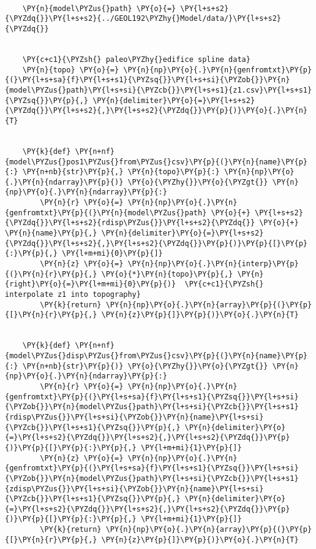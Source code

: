 \begin{tcolorbox}[breakable, size=fbox, boxrule=1pt, pad at break*=1mm,colback=cellbackground, colframe=cellborder]
\begin{Verbatim}[commandchars=\\\{\}]
    
    \PY{n}{model\PYZus{}path} \PY{o}{=} \PY{l+s+s2}{\PYZdq{}}\PY{l+s+s2}{../GEOL192\PYZhy{}Model/data/}\PY{l+s+s2}{\PYZdq{}}
    
    
    \PY{c+c1}{\PYZsh{} paleo\PYZhy{}edifice spline data}
    \PY{n}{topo} \PY{o}{=} \PY{n}{np}\PY{o}{.}\PY{n}{genfromtxt}\PY{p}{(}\PY{l+s+sa}{f}\PY{l+s+s1}{\PYZsq{}}\PY{l+s+si}{\PYZob{}}\PY{n}{model\PYZus{}path}\PY{l+s+si}{\PYZcb{}}\PY{l+s+s1}{z1.csv}\PY{l+s+s1}{\PYZsq{}}\PY{p}{,} \PY{n}{delimiter}\PY{o}{=}\PY{l+s+s2}{\PYZdq{}}\PY{l+s+s2}{,}\PY{l+s+s2}{\PYZdq{}}\PY{p}{)}\PY{o}{.}\PY{n}{T}
    
    
    \PY{k}{def} \PY{n+nf}{model\PYZus{}pos1\PYZus{}from\PYZus{}csv}\PY{p}{(}\PY{n}{name}\PY{p}{:} \PY{n+nb}{str}\PY{p}{,} \PY{n}{topo}\PY{p}{:} \PY{n}{np}\PY{o}{.}\PY{n}{ndarray}\PY{p}{)} \PY{o}{\PYZhy{}}\PY{o}{\PYZgt{}} \PY{n}{np}\PY{o}{.}\PY{n}{ndarray}\PY{p}{:}
        \PY{n}{r} \PY{o}{=} \PY{n}{np}\PY{o}{.}\PY{n}{genfromtxt}\PY{p}{(}\PY{n}{model\PYZus{}path} \PY{o}{+} \PY{l+s+s2}{\PYZdq{}}\PY{l+s+s2}{rdisp\PYZus{}}\PY{l+s+s2}{\PYZdq{}} \PY{o}{+} \PY{n}{name}\PY{p}{,} \PY{n}{delimiter}\PY{o}{=}\PY{l+s+s2}{\PYZdq{}}\PY{l+s+s2}{,}\PY{l+s+s2}{\PYZdq{}}\PY{p}{)}\PY{p}{[}\PY{p}{:}\PY{p}{,} \PY{l+m+mi}{0}\PY{p}{]}
        \PY{n}{z} \PY{o}{=} \PY{n}{np}\PY{o}{.}\PY{n}{interp}\PY{p}{(}\PY{n}{r}\PY{p}{,} \PY{o}{*}\PY{n}{topo}\PY{p}{,} \PY{n}{right}\PY{o}{=}\PY{l+m+mi}{0}\PY{p}{)}  \PY{c+c1}{\PYZsh{} interpolate z1 into topography}
        \PY{k}{return} \PY{n}{np}\PY{o}{.}\PY{n}{array}\PY{p}{(}\PY{p}{[}\PY{n}{r}\PY{p}{,} \PY{n}{z}\PY{p}{]}\PY{p}{)}\PY{o}{.}\PY{n}{T}
    
    
    \PY{k}{def} \PY{n+nf}{model\PYZus{}disp\PYZus{}from\PYZus{}csv}\PY{p}{(}\PY{n}{name}\PY{p}{:} \PY{n+nb}{str}\PY{p}{)} \PY{o}{\PYZhy{}}\PY{o}{\PYZgt{}} \PY{n}{np}\PY{o}{.}\PY{n}{ndarray}\PY{p}{:}
        \PY{n}{r} \PY{o}{=} \PY{n}{np}\PY{o}{.}\PY{n}{genfromtxt}\PY{p}{(}\PY{l+s+sa}{f}\PY{l+s+s1}{\PYZsq{}}\PY{l+s+si}{\PYZob{}}\PY{n}{model\PYZus{}path}\PY{l+s+si}{\PYZcb{}}\PY{l+s+s1}{rdisp\PYZus{}}\PY{l+s+si}{\PYZob{}}\PY{n}{name}\PY{l+s+si}{\PYZcb{}}\PY{l+s+s1}{\PYZsq{}}\PY{p}{,} \PY{n}{delimiter}\PY{o}{=}\PY{l+s+s2}{\PYZdq{}}\PY{l+s+s2}{,}\PY{l+s+s2}{\PYZdq{}}\PY{p}{)}\PY{p}{[}\PY{p}{:}\PY{p}{,} \PY{l+m+mi}{1}\PY{p}{]}
        \PY{n}{z} \PY{o}{=} \PY{n}{np}\PY{o}{.}\PY{n}{genfromtxt}\PY{p}{(}\PY{l+s+sa}{f}\PY{l+s+s1}{\PYZsq{}}\PY{l+s+si}{\PYZob{}}\PY{n}{model\PYZus{}path}\PY{l+s+si}{\PYZcb{}}\PY{l+s+s1}{zdisp\PYZus{}}\PY{l+s+si}{\PYZob{}}\PY{n}{name}\PY{l+s+si}{\PYZcb{}}\PY{l+s+s1}{\PYZsq{}}\PY{p}{,} \PY{n}{delimiter}\PY{o}{=}\PY{l+s+s2}{\PYZdq{}}\PY{l+s+s2}{,}\PY{l+s+s2}{\PYZdq{}}\PY{p}{)}\PY{p}{[}\PY{p}{:}\PY{p}{,} \PY{l+m+mi}{1}\PY{p}{]}
        \PY{k}{return} \PY{n}{np}\PY{o}{.}\PY{n}{array}\PY{p}{(}\PY{p}{[}\PY{n}{r}\PY{p}{,} \PY{n}{z}\PY{p}{]}\PY{p}{)}\PY{o}{.}\PY{n}{T}
    

\end{Verbatim}
\end{tcolorbox}
